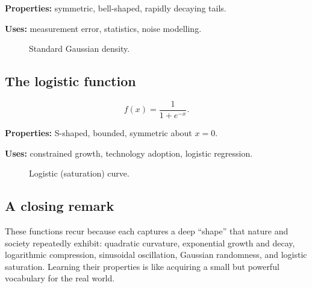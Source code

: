 \textbf{Properties:} symmetric, bell-shaped, rapidly decaying tails.

\textbf{Uses:} measurement error, statistics, noise modelling.

\begin{figure}[h]
\centering
{}
\caption{Standard Gaussian density.}
\end{figure}

\subsection{The logistic function}

\[
f(x)=\frac{1}{1+e^{-x}}.
\]

\textbf{Properties:} S-shaped, bounded, symmetric about $x=0$.

\textbf{Uses:} constrained growth, technology adoption, logistic regression.

\begin{figure}[h]
\centering
{}
\caption{Logistic (saturation) curve.}
\end{figure}

\subsection*{A closing remark}

These functions recur because each captures a deep ``shape'' that nature and
society repeatedly exhibit: quadratic curvature, exponential growth and decay,
logarithmic compression, sinusoidal oscillation, Gaussian randomness, and
logistic saturation.  Learning their properties is like acquiring a small but
powerful vocabulary for the real world.
